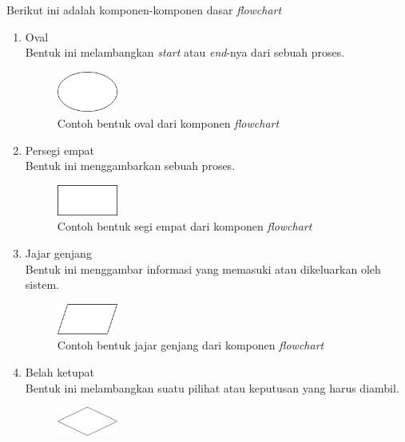 \documentclass[a4paper]{article}
\begin{document}
Berikut ini adalah komponen-komponen dasar \textit{flowchart}
\begin{enumerate}
    \item Oval\\
    Bentuk ini melambangkan \textit{start} atau \textit{end}-nya dari sebuah proses.\\
    \begin{figure}[h]
        \centering
        \includegraphics*[width=2cm]{./diagram/flowchart/component/oval.png}
        \caption{Contoh bentuk oval dari komponen \textit{flowchart}}
    \end{figure}
    \item Persegi empat\\
    Bentuk ini menggambarkan sebuah proses.\\
    \begin{figure}[h]
        \centering
        \includegraphics*[width=2cm]{./diagram/flowchart/component/rectangle.png}
        \caption{Contoh bentuk segi empat dari komponen \textit{flowchart}}
    \end{figure}
    \newpage
    \item Jajar genjang\\
    Bentuk ini menggambar informasi yang memasuki atau dikeluarkan oleh sistem.\\
    \begin{figure}[h]
        \centering
        \includegraphics*[width=2cm]{./diagram/flowchart/component/jajar genjang.png}
        \caption{Contoh bentuk jajar genjang dari komponen \textit{flowchart}}
    \end{figure}
    \item Belah ketupat\\
        Bentuk ini melambangkan suatu pilihat atau keputusan yang harus diambil.\\
    \begin{figure}[h]
        \centering
        \includegraphics*[width=2cm]{./diagram/flowchart/component/diamond.png}

\end{figure}
\end{enumerate}
\end{document}
